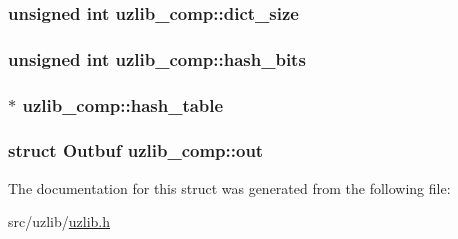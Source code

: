 \subsubsection[{\texorpdfstring{dict\+\_\+size}{dict_size}}]{\setlength{\rightskip}{0pt plus 5cm}unsigned int uzlib\+\_\+comp\+::dict\+\_\+size}\hypertarget{structuzlib__comp_ae12f4aeed98de5a9ac28a17e80e94b25}{}\label{structuzlib__comp_ae12f4aeed98de5a9ac28a17e80e94b25}
\subsubsection[{\texorpdfstring{hash\+\_\+bits}{hash_bits}}]{\setlength{\rightskip}{0pt plus 5cm}unsigned int uzlib\+\_\+comp\+::hash\+\_\+bits}\hypertarget{structuzlib__comp_a08c6c7a785a938fc7e8cd20246a2e713}{}\label{structuzlib__comp_a08c6c7a785a938fc7e8cd20246a2e713}
\subsubsection[{\texorpdfstring{hash\+\_\+table}{hash_table}}]{$\ast$ uzlib\+\_\+comp\+::hash\+\_\+table}\hypertarget{structuzlib__comp_aaac0b4d06083ea5666730aec37055bf1}{}\label{structuzlib__comp_aaac0b4d06083ea5666730aec37055bf1}
\subsubsection[{\texorpdfstring{out}{out}}]{\setlength{\rightskip}{0pt plus 5cm}struct {\bf Outbuf} uzlib\+\_\+comp\+::out}\hypertarget{structuzlib__comp_ac66a73f5d1846cb9a0b922c34b45a593}{}\label{structuzlib__comp_ac66a73f5d1846cb9a0b922c34b45a593}


The documentation for this struct was generated from the following file\+:\begin{DoxyCompactItemize}
\item 
src/uzlib/\hyperlink{uzlib_8h}{uzlib.\+h}\end{DoxyCompactItemize}
